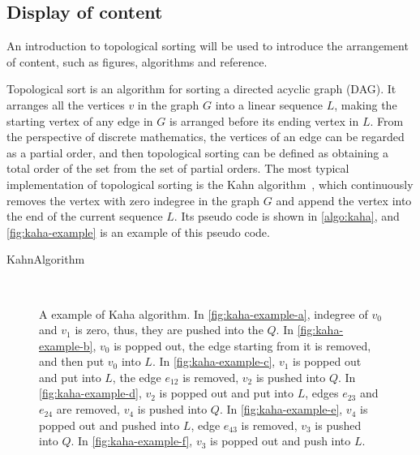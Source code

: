 \subsection{Display of content}

An introduction to topological sorting will be used to introduce the arrangement of content, such as figures, algorithms and reference.

Topological sort is an algorithm for sorting a directed acyclic graph (DAG).
It arranges all the vertices $v$ in the graph $G$ into a linear sequence $L$, making the starting vertex of any edge in $G$ is arranged before its ending vertex in $L$.
From the perspective of discrete mathematics, the vertices of an edge can be regarded as a partial order, and then topological sorting can be defined as obtaining a total order of the set from the set of partial orders.
The most typical implementation of topological sorting is the Kahn algorithm~\cite{kahn1962topological}, which continuously removes the vertex with zero indegree in the graph $G$ and append the vertex into the end of the current sequence $L$.
Its pseudo code is shown in \autoref{algo:kaha}, and \autoref{fig:kaha-example} is an example of this pseudo code.


\begin{algorithm}[H]
  \centering
  \caption{KahnAlgorithm}
  \label{algo:kaha}
  
\end{algorithm}


\begin{figure}[H]
  \centering
  \\
  \caption{
    A example of Kaha algorithm.
    In \autoref{fig:kaha-example-a}, indegree of $v_0$ and $v_1$ is zero, thus, they are pushed into the $Q$.
    In \autoref{fig:kaha-example-b}, $v_0$ is popped out, the edge starting from it is removed, and then put $v_0$ into $L$.
    In \autoref{fig:kaha-example-c}, $v_1$ is popped out and put into $L$, the edge $e_{12}$ is removed, $v_2$ is pushed into $Q$.
    In \autoref{fig:kaha-example-d}, $v_2$ is popped out and put into $L$, edges $e_{23}$ and $e_{24}$ are removed, $v_4$ is pushed into $Q$.
    In \autoref{fig:kaha-example-e}, $v_4$ is popped out and pushed into $L$, edge $e_{43}$ is removed, $v_3$ is pushed into $Q$.
    In \autoref{fig:kaha-example-f}, $v_3$ is popped out and push into $L$.
  }
  \label{fig:kaha-example} 
\end{figure}

